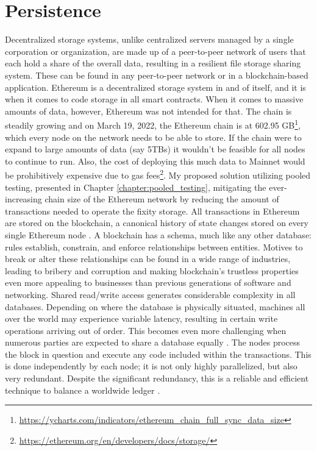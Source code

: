\section{Persistence}\label{sec:persistence}
Decentralized storage systems, unlike centralized servers managed by a single corporation or organization, are made up of a peer-to-peer network of users that each hold a share of the overall data, resulting in a resilient file storage sharing system. These can be found in any peer-to-peer network or in a blockchain-based application. Ethereum is a decentralized storage system in and of itself, and it is when it comes to code storage in all smart contracts. When it comes to massive amounts of data, however, Ethereum was not intended for that. 
The chain is steadily growing and on March 19, 2022, the Ethereum chain is at 602.95 GB\footnote{\url{https://ycharts.com/indicators/ethereum_chain_full_sync_data_size}}, which every node on the network needs to be able to store. If the chain were to expand to large amounts of data (say 5TBs) it wouldn't be feasible for all nodes to continue to run. Also, the cost of deploying this much data to Mainnet would be prohibitively expensive due to gas fees\footnote{\url{https://ethereum.org/en/developers/docs/storage/}}.
My proposed solution utilizing pooled testing, presented in Chapter \ref{chapter:pooled_testing}, mitigating the ever-increasing chain size of the Ethereum network by reducing the amount of transactions needed to operate the fixity storage. 
All transactions in Ethereum are stored on the blockchain, a canonical history of state changes stored on every single Ethereum node \cite[12]{dannen2017introducing}.
A blockchain has a schema, much like any other database: rules establish, constrain, and enforce relationships between entities. Motives to break or alter these relationships can be found in a wide range of industries, leading to bribery and corruption and making blockchain's trustless properties even more appealing to businesses than previous generations of software and networking. Shared read/write access generates considerable complexity in all databases. Depending on where the database is physically situated, machines all over the world may experience variable latency, resulting in certain write operations arriving out of order. This becomes even more challenging when numerous parties are expected to share a database equally \cite[20]{dannen2017introducing}. 
The nodes process the block in question and execute any code included within the transactions. This is done independently by each node; it is not only highly parallelized, but also very redundant. Despite the significant redundancy, this is a reliable and efficient technique to balance a worldwide ledger \cite[50]{dannen2017introducing}.
